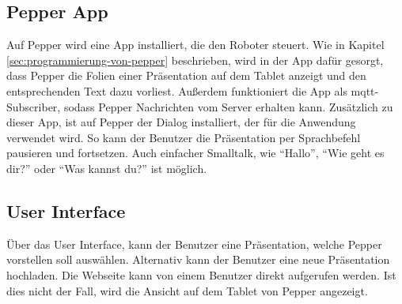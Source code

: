 \subsection{Pepper App}
Auf Pepper wird eine App installiert, die den Roboter steuert. Wie in Kapitel
\ref{sec:programmierung-von-pepper} beschrieben, wird in der App dafür gesorgt,
dass Pepper die Folien einer Präsentation auf dem Tablet anzeigt und den
entsprechenden Text dazu vorliest. Außerdem funktioniert die App als
\ac{mqtt}-Subscriber, sodass Pepper Nachrichten vom Server erhalten kann.
Zusätzlich zu dieser App, ist auf Pepper der Dialog installiert, der für die
Anwendung verwendet wird. So kann der Benutzer die Präsentation per Sprachbefehl
pausieren und fortsetzen. Auch einfacher Smalltalk, wie "`Hallo"', "`Wie geht es
dir?"' oder "`Was kannst du?"' ist möglich.

\subsection{User Interface}
Über das User Interface, kann der Benutzer eine Präsentation, welche Pepper
vorstellen soll auswählen. Alternativ kann der Benutzer eine neue Präsentation
hochladen. Die Webseite kann von einem Benutzer direkt aufgerufen werden. Ist
dies nicht der Fall, wird die Ansicht auf dem Tablet von Pepper angezeigt.

